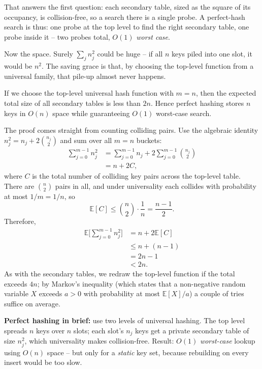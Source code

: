 That answers the first question: each secondary table, sized as the square of its occupancy, is collision-free, so a search there is a single probe. A perfect-hash search is thus: one probe at the top level to find the right secondary table, one probe inside it -- two probes total, $O(1)$ \emph{worst case}.

Now the space. Surely $\sum_j n_j^2$ could be huge -- if all $n$ keys piled into one slot, it would be $n^2$. The saving grace is that, by choosing the top-level function from a universal family, that pile-up almost never happens.

\begin{theorem}
\label{ch11:perfect-space-theorem}
If we choose the top-level universal hash function with $m = n$, then the expected total size of all secondary tables is less than $2n$. Hence perfect hashing stores $n$ keys in $O(n)$ space while guaranteeing $O(1)$ worst-case search.
\end{theorem}

The proof comes straight from counting colliding pairs. Use the algebraic identity $n_j^2 = n_j + 2\binom{n_j}{2}$ and sum over all $m = n$ buckets:
\begin{align*}
  \sum_{j=0}^{m-1} n_j^2 &= \sum_{j=0}^{m-1} n_j + 2\sum_{j=0}^{m-1} \binom{n_j}{2} \\
  &= n + 2C,
\end{align*}
where $C$ is the total number of colliding key pairs across the top-level table. There are $\binom{n}{2}$ pairs in all, and under universality each collides with probability at most $1/m = 1/n$, so
\[
  \mathbb{E}[C] \le \binom{n}{2}\cdot\frac{1}{n} = \frac{n-1}{2}.
\]
Therefore,
\begin{align*}
  \mathbb{E}\Big[\sum_{j=0}^{m-1} n_j^2\Big] &= n + 2\mathbb{E}[C] \\
  &\le n + (n-1) \\
  &= 2n - 1 \\
  &< 2n.
\end{align*}
As with the secondary tables, we redraw the top-level function if the total exceeds $4n$; by Markov's inequality (which states that a non-negative random variable $X$ exceeds $a > 0$ with probability at most $\mathbb{E}[X]/a$) a couple of tries suffice on average.

\begin{focusbox}
\textbf{Perfect hashing in brief:} use two levels of universal hashing. The top level spreads $n$ keys over $n$ slots; each slot's $n_j$ keys get a private secondary table of size $n_j^2$, which universality makes collision-free. Result: $O(1)$ \emph{worst-case} lookup using $O(n)$ space -- but only for a \emph{static} key set, because rebuilding on every insert would be too slow.
\end{focusbox}

